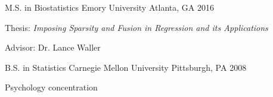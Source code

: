 


\begin{cventries}


\cventry
{M.S. in Biostatistics} %
{Emory University} %
{Atlanta, GA} %
{2016} %
{ %
\begin{cvitems}
\item {Thesis: \emph{Imposing Sparsity and Fusion in Regression and its Applications}}
\item {Advisor: Dr. Lance Waller}
\end{cvitems}
}


\cventry
{B.S. in Statistics} %
{Carnegie Mellon University} %
{Pittsburgh, PA} %
{2008} %
{ %
\begin{cvitems}
\item {Psychology concentration}
\end{cvitems}
}



\end{cventries} 


